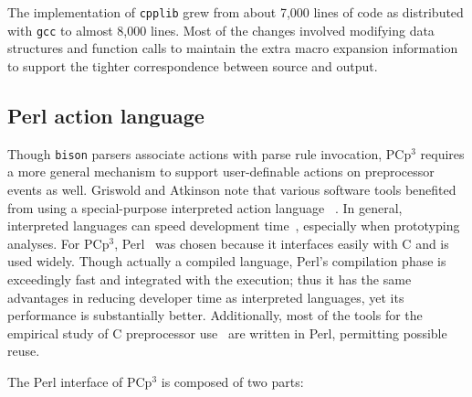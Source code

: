\documentclass{article}
\newcommand{\pcp}{\mbox{\textsf{PCp}$^3$}}
\newcommand{\Cpp}{\mbox{\textsf{cpp}}}
\newcommand{\Perl}{\mbox{\textsf{Perl}}}
\newcommand{\C}{\mbox{\textsf{C}}}
\begin{document}


The implementation of \texttt{cpplib} grew from about 7,000 lines of
code as distributed with \texttt{gcc} to almost 8,000 lines.  Most of
the changes involved modifying data structures and function calls to
maintain the extra macro expansion information to support the
tighter correspondence between source and output.  

\subsection{Perl action language}

Though \texttt{bison} parsers associate actions with parse rule
invocation, \pcp{} requires a more general mechanism to support
user-definable actions on preprocessor events as well. Griswold and
Atkinson note that various software tools benefited from using a
special-purpose interpreted action language ~\cite{Griswold96}.  In
general, interpreted languages can speed development
time~\cite{Scripting}, especially when prototyping analyses. For \pcp{},
\Perl{}~\cite{Perl,Camel} was chosen because it interfaces easily with
\C{} and is used widely. Though actually a compiled language, \Perl{}'s
compilation phase is exceedingly fast and integrated with the execution;
thus it has the same advantages in reducing developer time as
interpreted languages, yet its performance is substantially better.
Additionally, most of the tools for the empirical study of \C{}
preprocessor use~\cite{EmpCpp} are written in \Perl{}, permitting
possible reuse.

The \Perl{} interface of \pcp{} is composed of two parts:
\end{document}
